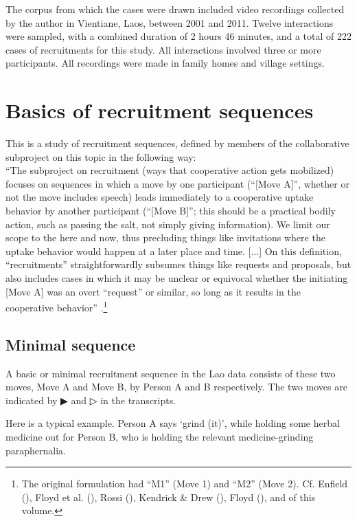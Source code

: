 \documentclass[output=paper]{langsci/langscibook}
\begin{document}
The corpus from which the cases were drawn included video recordings collected by the author in Vientiane, Laos, between 2001 and 2011. Twelve interactions were sampled, with a combined duration of 2 hours 46 minutes, and a total of 222 cases of recruitments for this study. All interactions involved three or more participants. All recordings were made in family homes and village settings.

\section{Basics of recruitment sequences}

This is a study of recruitment sequences, defined by members of the collaborative subproject on this topic in the following way:\\

“The subproject on recruitment (ways that cooperative action gets mobilized) focuses on sequences in which a move by one participant (“[Move A]”, whether or not the move includes speech) leads immediately to a cooperative uptake behavior by another participant (“[Move B]”; this should be a practical bodily action, such as passing the salt, not simply giving information). We limit our scope to the here and now, thus precluding things like invitations where the uptake behavior would happen at a later place and time. [...] On this definition, “recruitments” straightforwardly subsumes things like requests and proposals, but also includes cases in which it may be unclear or equivocal whether the initiating [Move A] was an overt “request” or similar, so long as it results in the cooperative behavior” \citep{Enfield2011b}.\footnote{The original formulation had “M1” (Move 1) and “M2” (Move 2). Cf. Enfield (\citeyear{Enfield2011a}), Floyd et al. (\citeyear{FloydEtAl2014b}), Rossi (\citeyear{Rossi2015a}), Kendrick \& Drew (\citeyear{KendrickDrew2016}), Floyd (\citeyear{Floyd2017}), and  of this volume.}

\subsection{Minimal sequence}
A basic or minimal recruitment sequence in the Lao data consists of these two moves, Move A and Move B, by Person A and B respectively. The two moves are indicated by ▶ and ▷ in the transcripts.

Here is a typical example. Person A says ‘grind (it)’, while holding some herbal medicine out for Person B, who is holding the relevant medicine-grinding paraphernalia.
\end{document}
